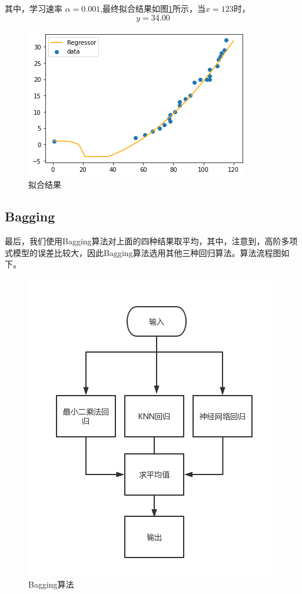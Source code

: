 其中，学习速率 $\alpha=0.001$,最终拟合结果如图\ref{13}所示，当$x=123$时，$$y=34.00$$
\begin{figure}[h]
	\centering
	\includegraphics[scale=0.55,angle=0]{images/13.png}
	\caption{拟合结果}
	\label{13}
\end{figure}







\subsection{Bagging}
最后，我们使用Bagging算法对上面的四种结果取平均，其中，注意到，高阶多项式模型的误差比较大，因此Bagging算法选用其他三种回归算法。算法流程图如下。
\begin{figure}[h]
	\centering
	\includegraphics[scale=0.45,angle=0]{images/14.png}
	\caption{Bagging算法}
	\label{14}
\end{figure}

